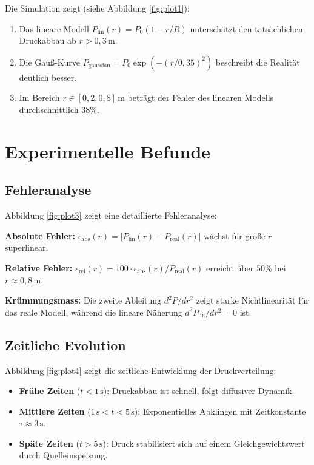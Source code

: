 \documentclass[a4paper,12pt]{article}
\theoremstyle{definition}
\begin{document}
Die Simulation zeigt (siehe Abbildung \ref{fig:plot1}):
\begin{enumerate}
	\item Das lineare Modell $P_{\text{lin}}(r) = P_0(1 - r/R)$ unterschätzt den tatsächlichen Druckabbau ab $r > 0{,}3 \, \text{m}$.
	\item Die Gauß-Kurve $P_{\text{gaussian}} = P_0 \exp(-(r/0{,}35)^2)$ beschreibt die Realität deutlich besser.
	\item Im Bereich $r \in [0{,}2, 0{,}8] \, \text{m}$ beträgt der Fehler des linearen Modells durchschnittlich $38\%$.
\end{enumerate}

\section{Experimentelle Befunde}

\subsection{Fehleranalyse}

Abbildung \ref{fig:plot3} zeigt eine detaillierte Fehleranalyse:

\textbf{Absolute Fehler:} $\epsilon_{\text{abs}}(r) = |P_{\text{lin}}(r) - P_{\text{real}}(r)|$ wächst für große $r$ superlinear.

\textbf{Relative Fehler:} $\epsilon_{\text{rel}}(r) = 100 \cdot \epsilon_{\text{abs}}(r) / P_{\text{real}}(r)$ erreicht über $50\%$ bei $r \approx 0{,}8 \, \text{m}$.

\textbf{Krümmungsmass:} Die zweite Ableitung $d^2P/dr^2$ zeigt starke Nichtlinearität für das reale Modell, während die lineare Näherung $d^2P_{\text{lin}}/dr^2 = 0$ ist.

\subsection{Zeitliche Evolution}

Abbildung \ref{fig:plot4} zeigt die zeitliche Entwicklung der Druckverteilung:

\begin{itemize}
	\item \textbf{Frühe Zeiten} ($t < 1 \, \text{s}$): Druckabbau ist schnell, folgt diffusiver Dynamik.
	\item \textbf{Mittlere Zeiten} ($1 \, \text{s} < t < 5 \, \text{s}$): Exponentielles Abklingen mit Zeitkonstante $\tau \approx 3 \, \text{s}$.
	\item \textbf{Späte Zeiten} ($t > 5 \, \text{s}$): Druck stabilisiert sich auf einem Gleichgewichtswert durch Quelleinspeisung.
\end{itemize}
\end{document}
